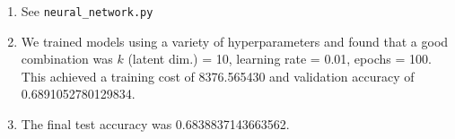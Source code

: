 \documentclass{article}
\begin{document}
\begin{enumerate}[label=\arabic*.]
\begin{enumerate}[label=(\roman*)]
\begin{enumerate}[label=(\alph*)]
                    \item See \texttt{neural\_network.py}
                    \item We trained models using a variety of hyperparameters and found that a good combination was $k$ (latent dim.) = 10, learning rate = 0.01, epochs = 100. This achieved a training cost of 8376.565430	 and validation accuracy of 0.6891052780129834.
                    \item The final test accuracy was 0.6838837143663562.


\end{enumerate}
\end{enumerate}
\end{enumerate}
\end{document}
